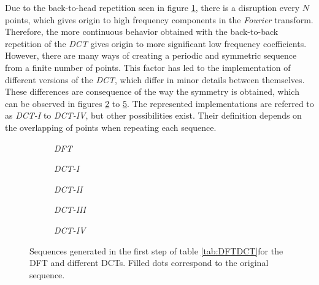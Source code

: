 Due to the back-to-head repetition seen in figure \ref{subfig:dft}, there is a disruption every $N$ points, which gives origin to high frequency components in the \emph{Fourier} transform. Therefore, the more continuous behavior obtained with the back-to-back repetition of the \emph{DCT} gives origin to more significant low frequency coefficients. However, there are many ways of creating a periodic and symmetric sequence from a finite number of points. This factor has led to the implementation of different versions of the \emph{DCT}, which differ in minor details between themselves. These differences are consequence of the way the symmetry is obtained, which can be observed in figures \ref{subfig:dct1} to \ref{subfig:dct4}. The represented implementations are referred to as \emph{DCT-I} to \emph{DCT-IV}, but other possibilities exist. Their definition depends on the overlapping of points when repeating each sequence.

\begin{figure}[h]
    \centering 
        \begin{subfigure}[c]{\textwidth}
            \centering
            
            \caption{\emph{DFT}}
            \label{subfig:dft}
        \end{subfigure}
        \begin{subfigure}[c]{0.45\textwidth}
            \centering
            
            \caption{\emph{DCT-I}}
            \label{subfig:dct1}
        \end{subfigure}
        \begin{subfigure}[c]{0.45\textwidth}
            \centering
            
            \caption{\emph{DCT-II}}
            \label{subfig:dct2}
        \end{subfigure}
        \begin{subfigure}[c]{0.45\textwidth}
            \centering
            
            \caption{\emph{DCT-III}}
            \label{subfig:dct3}
        \end{subfigure}
        \begin{subfigure}[c]{0.45\textwidth}
            \centering
            
            \caption{\emph{DCT-IV}}
            \label{subfig:dct4}
        \end{subfigure}
        \caption{Sequences generated in the first step of table \ref{tab:DFTDCT}for the DFT and different DCTs. Filled dots correspond to the original sequence.}
    \label{fig:2NSeq}
\end{figure}

